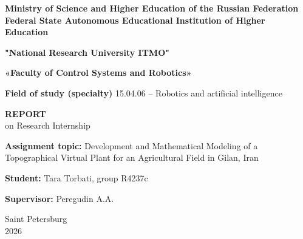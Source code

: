 \begin{titlepage}
    
    \fontsize{14pt}{18pt}\selectfont
    \centering
    
    \textbf{Ministry of Science and Higher Education of the Russian Federation}
    \\
    \textbf{Federal State Autonomous Educational Institution of Higher Education} \\
    \vspace{1.5cm}
    
    \textbf{"National Research University ITMO"}

    \vspace{2.5cm}

    \textbf{«Faculty of Control Systems and Robotics»}

    \vspace{1cm}

    \textbf{Field of study (specialty)} 15.04.06 – Robotics and artificial intelligence
    
    \vspace{2.2cm}
    
    \textbf{REPORT}
    \\
    \vspace{0.5cm}
    on Research Internship

    \vspace{1.8cm}

    \begin{flushleft}

    \textbf{Assignment topic:} Development and Mathematical Modeling of a Topographical Virtual Plant for an Agricultural Field in Gilan, Iran\\
    
    \vspace{1cm}
    
    \textbf{Student:} Tara Torbati, group R4237c    \\
    
    \vspace{1cm}
    
    \textbf{Supervisor:} Peregudin A.A.\\

    \end{flushleft}
    
    \vfill
    
    Saint Petersburg \\
    \vspace{0.5cm}
    2026
\end{titlepage}

